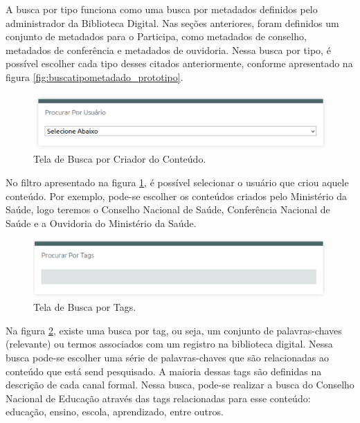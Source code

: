 A busca por tipo funciona como uma busca por metadados definidos pelo administrador da Biblioteca Digital. Nas seções anteriores, foram definidos um conjunto de metadados para o Participa, como metadados de conselho, metadados de conferência e metadados de ouvidoria. Nessa busca por tipo, é possível escolher cada tipo desses citados anteriormente, conforme apresentado na figura \ref{fig:buscatipometadado_prototipo}.

\graphicspath{{figuras/prototipo/}}
\begin{figure}[H]
\centering
\includegraphics[width=1.0\textwidth]{busca-criador}
\caption{Tela de Busca por Criador do Conteúdo.}
\label{fig:buscacriador_prototipo}
\end{figure}

No filtro apresentado na figura \ref{fig:buscacriador_prototipo}, é possível selecionar o usuário que criou aquele conteúdo. Por exemplo, pode-se escolher os conteúdos criados pelo Ministério da Saúde, logo teremos o Conselho Nacional de Saúde, Conferência Nacional de Saúde e a Ouvidoria do Ministério da Saúde.

\graphicspath{{figuras/prototipo/}}
\begin{figure}[H]
\centering
\includegraphics[width=1.0\textwidth]{busca-tags}
\caption{Tela de Busca por Tags.}
\label{fig:buscatags_prototipo}
\end{figure}

Na figura \ref{fig:buscatags_prototipo}, existe uma busca por tag, ou seja, um conjunto de palavras-chaves (relevante) ou termos associados com um registro na biblioteca digital. Nessa busca pode-se escolher uma série de palavras-chaves que são relacionadas ao conteúdo que está send pesquisado. A maioria dessas tags são definidas na descrição de cada canal formal. Nessa busca, pode-se realizar a busca do Conselho Nacional de Educação através das tags relacionadas para esse conteúdo: educação, ensino, escola, aprendizado, entre outros.


